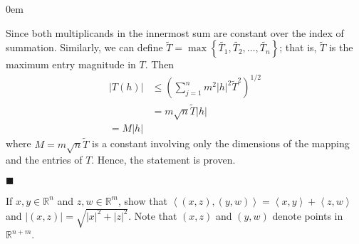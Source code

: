 \documentclass[12pt]{article}
\renewcommand{\qed}{\hfill$\blacksquare$}
\renewenvironment{proof}{\begin{addmargin}[1em]{0em}\begin{newproof}}{\end{newproof}\end{addmargin}\qed}
\newenvironment{problem}[2][Problem]{\begin{trivlist}
\item[\hskip \labelsep {\bfseries #1}\hskip \labelsep {\bfseries #2.}]}{\end{trivlist}}
\begin{document}
\begin{proof}
\begin{equation*}
\end{equation*}
Since both multiplicands in the innermost sum are constant over the index of summation. Similarly, we can define $\tilde{T} = \max \left\{ \tilde{T_1}, \tilde{T_2}, \ldots, \tilde{T_n} \right\}$; that is, $\tilde{T}$ is the maximum entry magnitude in $T$. Then
\begin{equation*}
\begin{split}
\left|T\left(h\right)\right| & \leq \left( \sum_{j=1}^n m^2 \left|h\right|^2 \tilde{T}^2 \right)^{1/2} \\
& =m\sqrt{n}\tilde{T} \left|h\right| \\
= M\left| h\right|
\end{split}
\end{equation*}
where $M = m\sqrt{n}\tilde{T}$ is a constant involving only the dimensions of the mapping and the entries of $T$. Hence, the statement is proven.
\end{proof}
 
 
 
 
\begin{problem}{1.11}
If $x,y\in \mathbb{R}^n$ and $z,w\in \mathbb{R}^m$, show that $\left\langle \left(x,z\right),\left(y,w\right) \right\rangle = \left\langle x,y \right\rangle + \left\langle z,w\right\rangle$ and $\left|\left(x,z\right)\right| = \sqrt{\left|x\right|^2+\left|z\right|^2}$. Note that $\left(x,z\right)$ and $\left(y,w\right)$ denote points in $\mathbb{R}^{n+m}$.
\end{problem}
 
\end{document}

